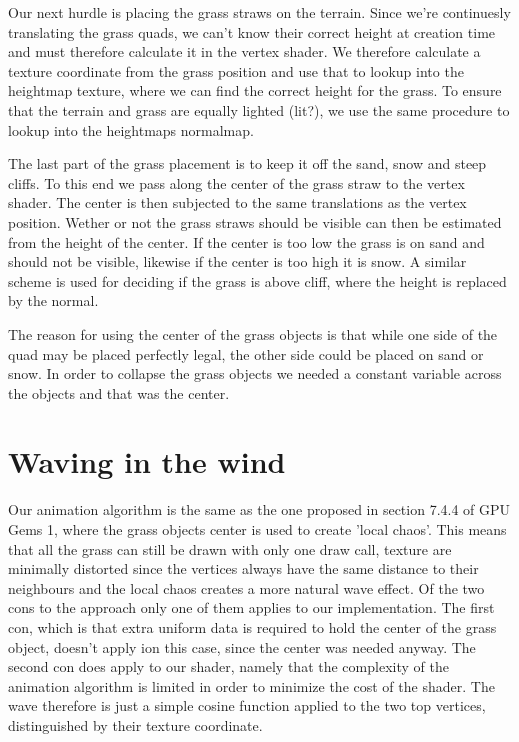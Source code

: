 
Our next hurdle is placing the grass straws on the terrain. Since
we're continuesly translating the grass quads, we can't know their
correct height at creation time and must therefore calculate it in the
vertex shader. We therefore calculate a texture coordinate from the
grass position and use that to lookup into the heightmap texture,
where we can find the correct height for the grass. To ensure that the
terrain and grass are equally lighted (lit?), we use the same
procedure to lookup into the heightmaps normalmap.


The last part of the grass placement is to keep it off the sand, snow
and steep cliffs. To this end we pass along the center of the grass
straw to the vertex shader. The center is then subjected to the same
translations as the vertex position. Wether or not the grass straws
should be visible can then be estimated from the height of the
center. If the center is too low the grass is on sand and should not
be visible, likewise if the center is too high it is snow. A similar
scheme is used for deciding if the grass is above cliff, where the
height is replaced by the normal.

The reason for using the center of the grass objects is that while one
side of the quad may be placed perfectly legal, the other side could
be placed on sand or snow. In order to collapse the grass objects we
needed a constant variable across the objects and that was the center.


\section{Waving in the wind}

Our animation algorithm is the same as the one proposed in section
7.4.4 of GPU Gems 1, where the grass objects center is used to create
'local chaos'. This means that all the grass can still be drawn with
only one draw call, texture are minimally distorted since the vertices
always have the same distance to their neighbours and the local chaos
creates a more natural wave effect. Of the two cons to the approach
only one of them applies to our implementation. The first con, which
is that extra uniform data is required to hold the center of the grass
object, doesn't apply ion this case, since the center was needed
anyway. The second con does apply to our shader, namely that the
complexity of the animation algorithm is limited in order to minimize
the cost of the shader. The wave therefore is just a simple cosine
function applied to the two top vertices, distinguished by their
texture coordinate.


